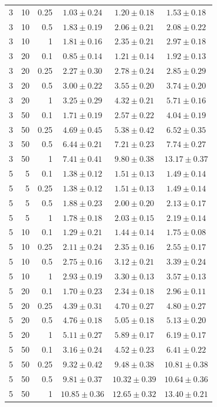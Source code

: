 \begin{table}[htbp]
\begin{tabular}{@{}rrrccc@{}}
3 & 10 & 0.25 & $1.03 \pm 0.24$ & $1.20 \pm 0.18$ & $1.53 \pm 0.18$ \\
3 & 10 & 0.5 & $1.83 \pm 0.19$ & $2.06 \pm 0.21$ & $2.08 \pm 0.22$ \\
3 & 10 & 1 & $1.81 \pm 0.16$ & $2.35 \pm 0.21$ & $2.97 \pm 0.18$ \\
3 & 20 & 0.1 & $0.85 \pm 0.14$ & $1.21 \pm 0.14$ & $1.92 \pm 0.13$ \\
3 & 20 & 0.25 & $2.27 \pm 0.30$ & $2.78 \pm 0.24$ & $2.85 \pm 0.29$ \\
3 & 20 & 0.5 & $3.00 \pm 0.22$ & $3.55 \pm 0.20$ & $3.74 \pm 0.20$ \\
3 & 20 & 1 & $3.25 \pm 0.29$ & $4.32 \pm 0.21$ & $5.71 \pm 0.16$ \\
3 & 50 & 0.1 & $1.71 \pm 0.19$ & $2.57 \pm 0.22$ & $4.04 \pm 0.19$ \\
3 & 50 & 0.25 & $4.69 \pm 0.45$ & $5.38 \pm 0.42$ & $6.52 \pm 0.35$ \\
3 & 50 & 0.5 & $6.44 \pm 0.21$ & $7.21 \pm 0.23$ & $7.74 \pm 0.27$ \\
3 & 50 & 1 & $7.41 \pm 0.41$ & $9.80 \pm 0.38$ & $13.17 \pm 0.37$ \\
\midrule
5 & 5 & 0.1 & $1.38 \pm 0.12$ & $1.51 \pm 0.13$ & $1.49 \pm 0.14$ \\
5 & 5 & 0.25 & $1.38 \pm 0.12$ & $1.51 \pm 0.13$ & $1.49 \pm 0.14$ \\
5 & 5 & 0.5 & $1.88 \pm 0.23$ & $2.00 \pm 0.20$ & $2.13 \pm 0.17$ \\
5 & 5 & 1 & $1.78 \pm 0.18$ & $2.03 \pm 0.15$ & $2.19 \pm 0.14$ \\
5 & 10 & 0.1 & $1.29 \pm 0.21$ & $1.44 \pm 0.14$ & $1.75 \pm 0.08$ \\
5 & 10 & 0.25 & $2.11 \pm 0.24$ & $2.35 \pm 0.16$ & $2.55 \pm 0.17$ \\
5 & 10 & 0.5 & $2.75 \pm 0.16$ & $3.12 \pm 0.21$ & $3.39 \pm 0.24$ \\
5 & 10 & 1 & $2.93 \pm 0.19$ & $3.30 \pm 0.13$ & $3.57 \pm 0.13$ \\
5 & 20 & 0.1 & $1.70 \pm 0.23$ & $2.34 \pm 0.18$ & $2.96 \pm 0.11$ \\
5 & 20 & 0.25 & $4.39 \pm 0.31$ & $4.70 \pm 0.27$ & $4.80 \pm 0.27$ \\
5 & 20 & 0.5 & $4.76 \pm 0.18$ & $5.05 \pm 0.18$ & $5.13 \pm 0.20$ \\
5 & 20 & 1 & $5.11 \pm 0.27$ & $5.89 \pm 0.17$ & $6.19 \pm 0.17$ \\
5 & 50 & 0.1 & $3.16 \pm 0.24$ & $4.52 \pm 0.23$ & $6.41 \pm 0.22$ \\
5 & 50 & 0.25 & $9.32 \pm 0.42$ & $9.48 \pm 0.38$ & $10.81 \pm 0.38$ \\
5 & 50 & 0.5 & $9.81 \pm 0.37$ & $10.32 \pm 0.39$ & $10.64 \pm 0.36$ \\
5 & 50 & 1 & $10.85 \pm 0.36$ & $12.65 \pm 0.32$ & $13.40 \pm 0.21$ \\
\bottomrule
\end{tabular}
\end{table}
